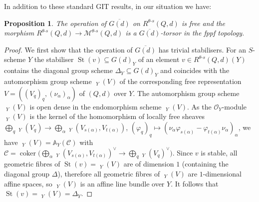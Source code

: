 \documentclass[10pt,a4paper]{amsart}
\newtheorem{prop}[theo]{Proposition}
\theoremstyle{definition}
\def\phi{\varphi}
\def\A{\mathds A}
\def\O{\mathcal O}
\DeclareMathOperator{\SHom}{{\mathscr H}\!\!\text{$om$}\,}
\DeclareMathOperator{\SEnd}{{\mathscr E}\!\text{$nd$}\,}
\DeclareMathOperator{\UEnd}{\underline{End}}
\DeclareMathOperator{\UAut}{\underline{Aut}}
\DeclareMathOperator{\coker}{coker}
\DeclareMathOperator{\St}{St}
\begin{document}
In addition to these standard GIT results, in our situation we have:

\begin{prop}\label{prop:Rs-Mtheta-torsor}
The operation of $\overline{G(d)}$ on $R^{\theta\text{-}s}(Q,d)$ is free
and the morphism
$R^{\theta\text{-}s}(Q,d)\to\mathcal M^{\theta\text{-}s}(Q,d)$ 
is a $\overline{G(d)}$-torsor in the fppf topology.
\end{prop}
\begin{proof}
We first show that the operation of $\overline{G(d)}$ has trivial stabilisers.
For an $S$-scheme $Y$ the stabiliser $\St(v)\subseteq G(d)_Y$ of an element 
$v\in R^{\theta\text{-}s}(Q,d)(Y)$ contains the diagonal group scheme 
$\Delta_Y\subseteq G(d)_Y$ and coincides with the automorphism group scheme 
$\UAut_Y(V)$ of the corresponding free representation $V=((V_q)_q,(\nu_\alpha)_\alpha)$ 
of $(Q,d)$ over $Y$.
The automorphism group scheme $\UAut_Y(V)$ is open dense in the endomorphism
scheme $\UEnd_Y(V)$. As the $\O_Y$-module $\SEnd_Y(V)$ is the kernel of 
the homomorphism of locally free sheaves
$\bigoplus_q\SEnd_Y(V_q)\to\bigoplus_\alpha\SHom_Y(V_{s(\alpha)},V_{t(\alpha)})$, 
$(\phi_q)_q\mapsto(\nu_\alpha\phi_{s(\alpha)}-\phi_{t(\alpha)}\nu_\alpha)_\alpha$,
we have $\UEnd_Y(V)=\A_Y(\mathscr C)$ with 
$\mathscr C=\coker\big(\bigoplus_\alpha\SHom_Y(V_{s(\alpha)},V_{t(\alpha)})^\vee
\!\to\bigoplus_q\SEnd_Y(V_q)^\vee\big)$.
Since $v$ is stable, all geometric fibres of $\St(v)=\UAut_Y(V)$ are of dimension $1$
(containing the diagonal group $\Delta$), therefore all geometric fibres 
of $\UEnd_Y(V)$ are $1$-dimensional affine spaces, so $\UEnd_Y(V)$ is an 
affine line bundle over $Y$.
It follows that $\St(v)=\UAut_Y(V)=\Delta_Y$.


\end{proof}
\end{document}
